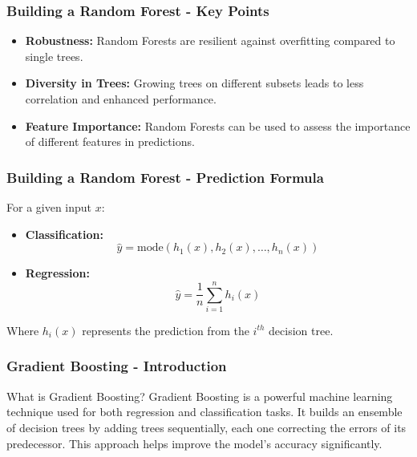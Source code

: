 \documentclass[aspectratio=169]{beamer}
\begin{document}
\begin{frame}[fragile]
    \frametitle{Building a Random Forest - Key Points}
    \begin{itemize}
        \item \textbf{Robustness:} Random Forests are resilient against overfitting compared to single trees.
        \item \textbf{Diversity in Trees:} Growing trees on different subsets leads to less correlation and enhanced performance.
        \item \textbf{Feature Importance:} Random Forests can be used to assess the importance of different features in predictions.
    \end{itemize}
\end{frame}

\begin{frame}[fragile]
    \frametitle{Building a Random Forest - Prediction Formula}
    For a given input \( x \):
    \begin{itemize}
        \item \textbf{Classification:}
        \begin{equation}
        \hat{y} = \text{mode}(h_1(x), h_2(x), \ldots, h_n(x))
        \end{equation}
        \item \textbf{Regression:}
        \begin{equation}
        \hat{y} = \frac{1}{n} \sum_{i=1}^{n} h_i(x)
        \end{equation}
    \end{itemize}
    Where \( h_i(x) \) represents the prediction from the \( i^{th} \) decision tree.
\end{frame}

\begin{frame}[fragile]
    \frametitle{Gradient Boosting - Introduction}
    
    \begin{block}{What is Gradient Boosting?}
        Gradient Boosting is a powerful machine learning technique used for both regression and classification tasks. It builds an ensemble of decision trees by adding trees sequentially, each one correcting the errors of its predecessor. This approach helps improve the model's accuracy significantly.
    \end{block}
\end{frame}
\end{document}
